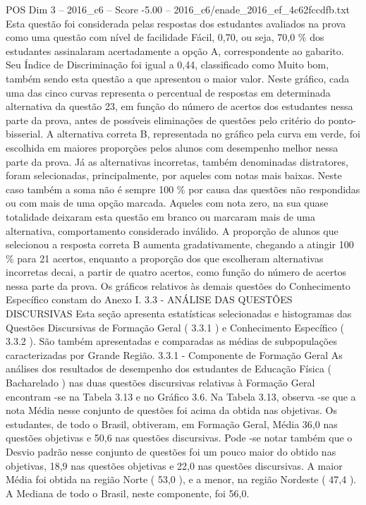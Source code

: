 \begin{textsample}{POS Dim 3 – 2016\_c6 – Score -5.00 – 2016\_c6/enade\_2016\_ef\_4c62fccdfb.txt}
Esta questão foi considerada pelas respostas dos estudantes avaliados na prova como uma questão com nível de facilidade Fácil, 0,70, ou seja, 70,0 \% dos estudantes assinalaram acertadamente a opção A, correspondente ao gabarito.
Seu Índice de Discriminação foi igual a 0,44, classificado como Muito bom, também sendo esta questão a que apresentou o maior valor.
Neste gráfico, cada uma das cinco curvas representa o percentual de respostas em determinada alternativa da questão 23, em função do número de acertos dos estudantes nessa parte da prova, antes de possíveis eliminações de questões pelo critério do ponto-bisserial.
A alternativa correta B, representada no gráfico pela curva em verde, foi escolhida em maiores proporções pelos alunos com desempenho melhor nessa parte da prova.
Já as alternativas incorretas, também denominadas distratores, foram selecionadas, principalmente, por aqueles com notas mais baixas.
Neste caso também a soma não é sempre 100 \% por causa das questões não respondidas ou com mais de uma opção marcada.
Aqueles com nota zero, na sua quase totalidade deixaram esta questão em branco ou marcaram mais de uma alternativa, comportamento considerado inválido.
A proporção de alunos que selecionou a resposta correta B aumenta gradativamente, chegando a atingir 100 \% para 21 acertos, enquanto a proporção dos que escolheram alternativas incorretas decai, a partir de quatro acertos, como função do número de acertos nessa parte da prova.
Os gráficos relativos às demais questões do Conhecimento Específico constam do Anexo I. 3.3 - ANÁLISE DAS QUESTÕES DISCURSIVAS Esta seção apresenta estatísticas selecionadas e histogramas das Questões Discursivas de Formação Geral ( 3.3.1 ) e Conhecimento Específico ( 3.3.2 ).
São também apresentadas e comparadas as médias de subpopulações caracterizadas por Grande Região. 3.3.1 - Componente de Formação Geral As análises dos resultados de desempenho dos estudantes de Educação Física ( Bacharelado ) nas duas questões discursivas relativas à Formação Geral encontram -se na Tabela 3.13 e no Gráfico 3.6.
Na Tabela 3.13, observa -se que a nota Média nesse conjunto de questões foi acima da obtida nas objetivas.
Os estudantes, de todo o Brasil, obtiveram, em Formação Geral, Média 36,0 nas questões objetivas e 50,6 nas questões discursivas.
Pode -se notar também que o Desvio padrão nesse conjunto de questões foi um pouco maior do obtido nas objetivas, 18,9 nas questões objetivas e 22,0 nas questões discursivas.
A maior Média foi obtida na região Norte ( 53,0 ), e a menor, na região Nordeste ( 47,4 ).
A Mediana de todo o Brasil, neste componente, foi 56,0.

\end{textsample}
